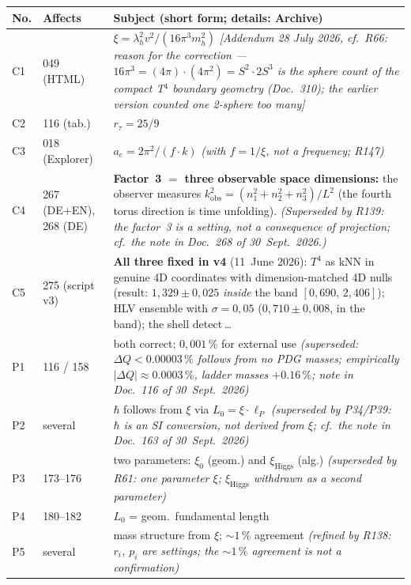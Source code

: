 \begingroup\small
\begin{longtable}{@{}p{0.9cm}p{3.1cm}p{10.2cm}@{}}
\toprule
\textbf{No.} & \textbf{Affects} & \textbf{Subject (short form; details: Archive)} \\
\midrule\endhead
\bottomrule\endfoot
C1 & 049 (HTML) & $\xi = \lambda_h^2 v^2/(16\pi^3 m_h^2)$ \emph{[Addendum 28 July 2026, cf.\ R66: reason for the correction --- $16\pi^3 = (4\pi)\cdot(4\pi^2) = S^2\cdot 2S^3$ is the sphere count of the compact T$^4$ boundary geometry (Doc.~310); the earlier version counted one 2-sphere too many]} \\
C2 & 116 (tab.) & $r_\tau = 25/9$ \\
C3 & 018 (Explorer) & $a_e = 2\pi^2/(f \cdot k)$ \emph{(with $f = 1/\xi$, not a frequency; R147)} \\
C4 & 267 (DE+EN), 268 (DE) & \textbf{Factor~3 $=$ three observable space dimensions:} the observer measures $k_\mathrm{obs}^2=(n_1^2+n_2^2+n_3^2)/L^2$ (the fourth torus direction is time unfolding). \emph{(Superseded by R139: the factor~3 is a setting, not a consequence of projection; cf.\ the note in Doc.~268 of 30~Sept.~2026.)} \\
C5 & 275 (script v3) & \textbf{All three fixed in v4} (11~June 2026): $T^4$ as kNN in genuine 4D coordinates with dimension-matched 4D nulls (result: $1{,}329\pm0{,}025$ \emph{inside} the band $[0{,}690,\,2{,}406]$); HLV ensemble with $\sigma=0{,}05$ ($0{,}710\pm0{,}008$, in the band); the shell detect\,\ldots \\
P1 & 116 / 158 & both correct; $0{,}001\,\%$ for external use \emph{(superseded: $\Delta Q<0.00003\,\%$ follows from no PDG masses; empirically $|\Delta Q|\approx0.0003\,\%$, ladder masses $+0.16\,\%$; note in Doc.~116 of 30~Sept.~2026)} \\
P2 & several & $\hbar$ follows from $\xi$ via $L_0 = \xi\cdot\ell_P$ \emph{(superseded by P34/P39: $\hbar$ is an SI conversion, not derived from $\xi$; cf.\ the note in Doc.~163 of 30~Sept.~2026)} \\
P3 & 173--176 & two parameters: $\xi_0$ (geom.) and $\xi_{\text{Higgs}}$ (alg.) \emph{(superseded by R61: one parameter $\xi$; $\xi_{\text{Higgs}}$ withdrawn as a second parameter)} \\
P4 & 180--182 & $L_0$ = geom.\ fundamental length \\
P5 & several & mass structure from $\xi$; $\sim 1\,\%$ agreement \emph{(refined by R138: $r_i$, $p_i$ are settings; the $\sim1\,\%$ agreement is not a confirmation)} \\

\end{longtable}
